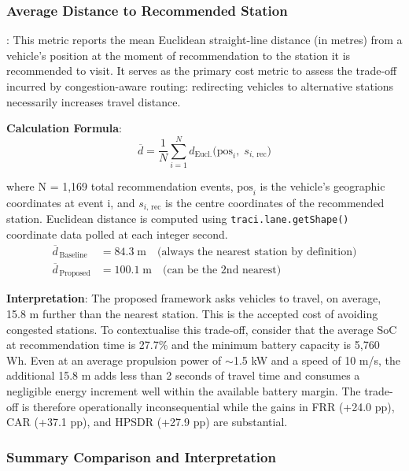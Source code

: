 \documentclass[conference]{IEEEtran}
\begin{document}
\subsubsection{Average Distance to Recommended Station}: This metric reports the mean Euclidean
straight-line distance (in metres) from a vehicle's position at the
moment of recommendation to the station it is recommended to visit. It
serves as the primary cost metric to assess the trade-off incurred by
congestion-aware routing: redirecting vehicles to alternative stations
necessarily increases travel distance.


\textbf{Calculation Formula}:
\begin{equation}
  \overline{d} =
    \frac{1}{N}\sum_{i=1}^{N}
      d_{\text{Eucl.}}\!\bigl(\mathrm{pos}_{i},\;
                               s_{i,\,\text{rec}}\bigr)
  \label{eq:avgdist}
\end{equation}

where N = 1,169 total recommendation events, $\mathrm{pos}_{i}$ is the
vehicle's geographic coordinates at event i, and
$s_{i,\,\text{rec}}$ is the centre coordinates of the recommended
station. Euclidean distance is computed using
\texttt{traci.lane.getShape()} coordinate data polled at each integer
second.
\begin{align}
  \overline{d}_{\,\text{Baseline}} &= 84.3\;\text{m}
    \quad\text{(always the nearest station by definition)}
    \label{eq:dist_base}\\
  \overline{d}_{\,\text{Proposed}} &= 100.1\;\text{m}
    \quad\text{(can be the 2nd nearest)}
    \label{eq:dist_prop}
\end{align}

\textbf{Interpretation}: The proposed framework asks vehicles to travel,
on average, 15.8 m further than the nearest station. This is the
accepted cost of avoiding congested stations. To contextualise this
trade-off, consider that the average SoC at recommendation time is
27.7\% and the minimum battery capacity is 5,760 Wh. Even at an average
propulsion power of ${\sim}$1.5 kW and a speed of 10 m/s, the
additional 15.8 m adds less than 2 seconds of travel time and consumes
a negligible energy increment well within the available battery margin.
The trade-off is therefore operationally inconsequential while the gains
in FRR (+24.0 pp), CAR (+37.1 pp), and HPSDR (+27.9 pp) are
substantial.

\subsubsection{Summary Comparison and Interpretation}
\end{document}
